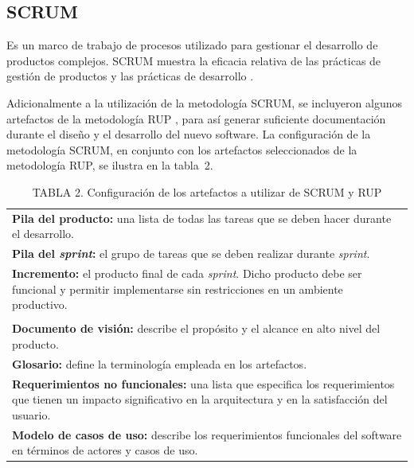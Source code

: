 \documentclass[conference]{IEEEtran}
\begin{document}
\vfill

	\subsection{SCRUM}
		Es un marco de trabajo de procesos utilizado para gestionar el desarrollo de productos complejos. SCRUM muestra la eficacia relativa de las pr\'{a}cticas de gesti\'{o}n de productos y las pr\'{a}cticas de desarrollo \cite{Schwaber&Sutherland}.

		Adicionalmente a la utilizaci\'{o}n de la metodolog\'{i}a SCRUM, se incluyeron algunos artefactos de la metodolog\'{i}a RUP \cite{Kroll&Kruchten}, para as\'{i} generar suficiente documentaci\'{o}n durante el dise\~{n}o y el desarrollo del nuevo software. La configuraci\'{o}n de la metodolog\'{i}a SCRUM, en conjunto con los artefactos seleccionados de la metodolog\'{i}a RUP, se ilustra en la \mbox{tabla 2}.

\vfill
		\FloatBarrier %
		\begin{table}[htb]
			\caption{TABLA 2. Configuraci\'{o}n de los artefactos a utilizar de SCRUM y RUP}
			\label{tabla_2}
			\centering
			\setlength{\extrarowheight}{2.5pt}
			\begin{tabulary}{8.8cm}{|J|}
				\hline
				\\ \hline
				\textbf{Pila del producto: }una lista de todas las tareas que se deben hacer durante el desarrollo.\\ \hline
				\textbf{Pila del \textit{sprint}: }el grupo de tareas que se deben realizar durante \textit{sprint}.\\ \hline
				\textbf{Incremento: }el producto final de cada \textit{sprint}. Dicho producto debe ser funcional y permitir implementarse sin restricciones en un ambiente productivo.\\ \hline
				\\ \hline
				\textbf{Documento de visi\'{o}n: }describe el prop\'{o}sito y el alcance en alto nivel del producto.\\
\hline
				\textbf{Glosario: }define la terminolog\'{i}a empleada en los artefactos.\\ \hline
				\textbf{Requerimientos no funcionales: }una lista que especifica los requerimientos que tienen un impacto significativo en la arquitectura y en la satisfacci\'{o}n del usuario.\\ \hline
		\textbf{Modelo de casos de uso: }describe los requerimientos funcionales del software en t\'{e}rminos de actores y casos de uso.\\ \hline
			\end{tabulary}
		\end{table}
		\FloatBarrier %
\end{document}
